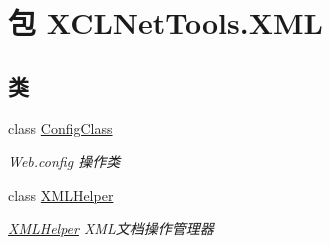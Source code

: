 \hypertarget{namespace_x_c_l_net_tools_1_1_x_m_l}{\section{包 X\-C\-L\-Net\-Tools.\-X\-M\-L}
\label{namespace_x_c_l_net_tools_1_1_x_m_l}
}
\subsection*{类}
\begin{DoxyCompactItemize}
\item 
class \hyperlink{class_x_c_l_net_tools_1_1_x_m_l_1_1_config_class}{Config\-Class}
\begin{DoxyCompactList}\small\item\em Web.\-config 操作类 \end{DoxyCompactList}\item 
class \hyperlink{class_x_c_l_net_tools_1_1_x_m_l_1_1_x_m_l_helper}{X\-M\-L\-Helper}
\begin{DoxyCompactList}\small\item\em \hyperlink{class_x_c_l_net_tools_1_1_x_m_l_1_1_x_m_l_helper}{X\-M\-L\-Helper} X\-M\-L文档操作管理器 \end{DoxyCompactList}\end{DoxyCompactItemize}
